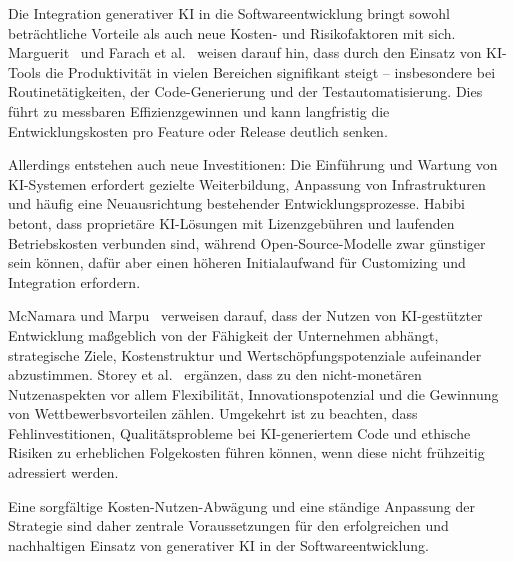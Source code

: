 Die Integration generativer KI in die Softwareentwicklung bringt sowohl
beträchtliche Vorteile als auch neue Kosten- und Risikofaktoren mit sich.
Marguerit~\cite{marguerit_augmenting_2025} und Farach et
al.~\cite{farach_evolving_2025} weisen darauf hin, dass durch den Einsatz von
KI-Tools die Produktivität in vielen Bereichen signifikant steigt –
insbesondere bei Routinetätigkeiten, der Code-Generierung und der
Testautomatisierung. Dies führt zu messbaren Effizienzgewinnen und kann
langfristig die Entwicklungskosten pro Feature oder Release deutlich senken.

Allerdings entstehen auch neue Investitionen: Die Einführung und Wartung von
KI-Systemen erfordert gezielte Weiterbildung, Anpassung von Infrastrukturen und
häufig eine Neuausrichtung bestehender Entwicklungsprozesse.
Habibi~\cite{habibi_open_2025} betont, dass proprietäre KI-Lösungen mit
Lizenzgebühren und laufenden Betriebskosten verbunden sind, während
Open-Source-Modelle zwar günstiger sein können, dafür aber einen höheren
Initialaufwand für Customizing und Integration erfordern.

McNamara und Marpu~\cite{mcnamara_exponential_2025} verweisen darauf, dass der
Nutzen von KI-gestützter Entwicklung maßgeblich von der Fähigkeit der
Unternehmen abhängt, strategische Ziele, Kostenstruktur und
Wertschöpfungspotenziale aufeinander abzustimmen. Storey et
al.~\cite{storey_generative_2025} ergänzen, dass zu den nicht-monetären
Nutzenaspekten vor allem Flexibilität, Innovationspotenzial und die Gewinnung
von Wettbewerbsvorteilen zählen. Umgekehrt ist zu beachten, dass
Fehlinvestitionen, Qualitätsprobleme bei KI-generiertem Code und ethische
Risiken zu erheblichen Folgekosten führen können, wenn diese nicht frühzeitig
adressiert werden.

Eine sorgfältige Kosten-Nutzen-Abwägung und eine ständige Anpassung der
Strategie sind daher zentrale Voraussetzungen für den erfolgreichen und
nachhaltigen Einsatz von generativer KI in der Softwareentwicklung.

